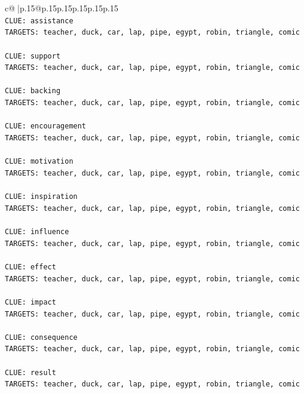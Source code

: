 \documentclass{article}
\begin{document}
{\begin{supertabular}{c@{$\;$}|p{.15\linewidth}@{}p{.15\linewidth}p{.15\linewidth}p{.15\linewidth}p{.15\linewidth}p{.15\linewidth}}
{{{\\ 
\texttt{CLUE: assistance} \\
\texttt{TARGETS: teacher, duck, car, lap, pipe, egypt, robin, triangle, comic} \\
\\ 
\texttt{CLUE: support} \\
\texttt{TARGETS: teacher, duck, car, lap, pipe, egypt, robin, triangle, comic} \\
\\ 
\texttt{CLUE: backing} \\
\texttt{TARGETS: teacher, duck, car, lap, pipe, egypt, robin, triangle, comic} \\
\\ 
\texttt{CLUE: encouragement} \\
\texttt{TARGETS: teacher, duck, car, lap, pipe, egypt, robin, triangle, comic} \\
\\ 
\texttt{CLUE: motivation} \\
\texttt{TARGETS: teacher, duck, car, lap, pipe, egypt, robin, triangle, comic} \\
\\ 
\texttt{CLUE: inspiration} \\
\texttt{TARGETS: teacher, duck, car, lap, pipe, egypt, robin, triangle, comic} \\
\\ 
\texttt{CLUE: influence} \\
\texttt{TARGETS: teacher, duck, car, lap, pipe, egypt, robin, triangle, comic} \\
\\ 
\texttt{CLUE: effect} \\
\texttt{TARGETS: teacher, duck, car, lap, pipe, egypt, robin, triangle, comic} \\
\\ 
\texttt{CLUE: impact} \\
\texttt{TARGETS: teacher, duck, car, lap, pipe, egypt, robin, triangle, comic} \\
\\ 
\texttt{CLUE: consequence} \\
\texttt{TARGETS: teacher, duck, car, lap, pipe, egypt, robin, triangle, comic} \\
\\ 
\texttt{CLUE: result} \\
\texttt{TARGETS: teacher, duck, car, lap, pipe, egypt, robin, triangle, comic} \\
\\ 
}}}
\end{supertabular}}
\end{document}
